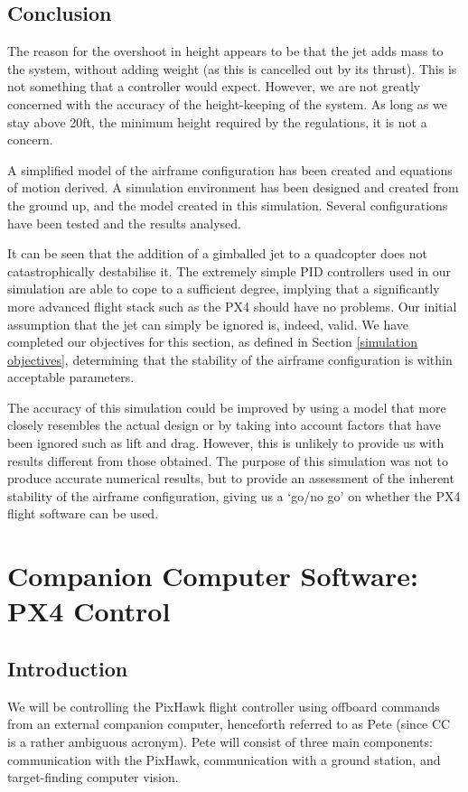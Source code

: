 \documentclass[11pt,twoside]{article}
\begin{document}
\subsection{Conclusion}
The reason for the overshoot in height appears to be that the jet adds mass to the system, without adding weight (as this is cancelled out by its thrust). This is not something that a controller would expect. However, we are not greatly concerned with the accuracy of the height-keeping of the system. As long as we stay above 20ft, the minimum height required by the regulations\cite{IMechE_rules}, it is not a concern.

A simplified model of the airframe configuration has been created and equations of motion derived. A simulation environment has been designed and created from the ground up, and the model created in this simulation. Several configurations have been tested and the results analysed.

It can be seen that the addition of a gimballed jet to a quadcopter does not catastrophically destabilise it. The extremely simple PID controllers used in our simulation are able to cope to a sufficient degree, implying that a significantly more advanced flight stack such as the PX4 should have no problems. Our initial assumption that the jet can simply be ignored is, indeed, valid. We have completed our objectives for this section, as defined in Section \ref{simulation objectives}, determining that the stability of the airframe configuration is within acceptable parameters.

The accuracy of this simulation could be improved by using a model that more closely resembles the actual design or by taking into account factors that have been ignored such as lift and drag. However, this is unlikely to provide us with results different from those obtained. The purpose of this simulation was not to produce accurate numerical results, but to provide an assessment of the inherent stability of the airframe configuration, giving us a `go/no go' on whether the PX4 flight software can be used.


\section{Companion Computer Software: PX4 Control}
\subsection{Introduction}\label{PX4 Control}
We will be controlling the PixHawk flight controller using offboard commands from an external companion computer, henceforth referred to as Pete (since CC is a rather ambiguous acronym). Pete will consist of three main components: communication with the PixHawk, communication with a ground station, and target-finding computer vision.
\end{document}

